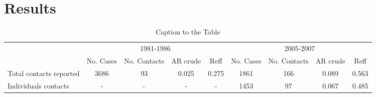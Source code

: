 \section{Results}


\usepackage[font=small,labelfont=bf,tableposition=top]{caption}
\usepackage{booktabs,multirow}


      \begin{table}[!ht]
        \footnotesize
        \caption{Caption to the Table}
        \label{tab:table}
        \centering
        \begin{tabular}{lcccccccc} 
        \toprule
          & \multicolumn{4}{c}{1981-1986} & \multicolumn{4}{c}{2005-2007} \\ %
\cmidrule(r){2-5} %
\cmidrule(l){6-9}
 & No. Cases & No. Contacts & AR crude & Reff & No. Cases & No. Contacts & AR crude & Reff\\ %
\midrule %
Total contacts reported & 3686 & 93 & 0.025 & 0.275 & 1861 & 166 & 0.089 & 0.563\\ 
Individuals contacts & - & - & - & - & 1453 & 97 & 0.067 & 0.485\\ \bottomrule
        \end{tabular}
      \end{table}